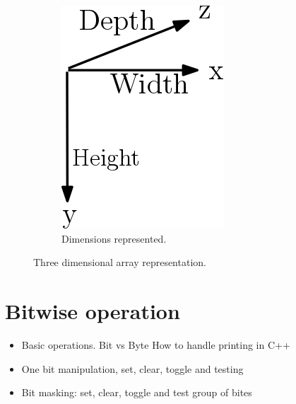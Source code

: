 \begin{figure}[htp]
\begin{subfigure}[b]{0.2\textwidth}
    \includegraphics[width=\textwidth]{img/arrow3D}
    \caption{Dimensions represented.}
    \label{fig:3b}
  \end{subfigure}
  \caption{Three dimensional array representation.}
  \label{fig:3D}
\end{figure}

\section{Bitwise operation}
\begin{itemize}
  \item Basic operations. Bit vs Byte How to handle printing in C++
  \item One bit manipulation, set, clear, toggle and testing
  \item Bit masking: set, clear, toggle and test group of bites
\end{itemize}

